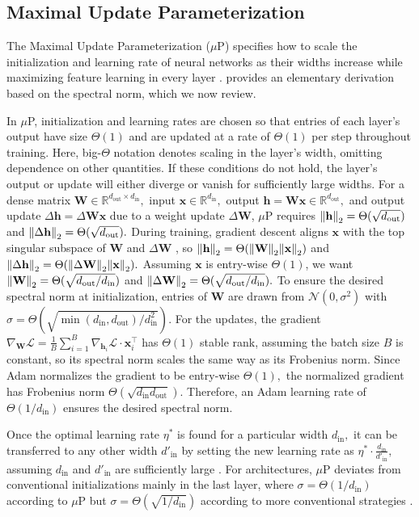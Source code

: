 \documentclass{article}
\newcommand{\mbf}[1]{{\boldsymbol{\mathbf{#1}}}}
\newcommand{\bm}{\mbf}
\theoremstyle{plain}
\theoremstyle{definition}
\theoremstyle{remark}
\newcommand{\mup}{$\mu$P\xspace}
\newcommand{\R}{\mathbb{R}}
\newcommand{\din}{{d_\mathrm{in}}}
\newcommand{\dout}{{d_\mathrm{out}}}
\begin{document}
%

\subsection{Maximal Update Parameterization}
The Maximal Update Parameterization (\mup) \citep{yang2021infty, yang2023iv, yang2021v} specifies how to scale the initialization and learning rate of neural networks as their widths increase while maximizing feature learning in every layer \citep{yang2021infty}. \citet{yang2023spectral} provides an elementary derivation based on the spectral norm, which we now review.

In \mup, initialization and learning rates are chosen so that entries of each layer's output have size $\Theta(1)$ and are updated at a rate of $\Theta(1)$ per step throughout training. Here, big-$\Theta$ notation denotes scaling in the layer's width, omitting dependence on other quantities. If these conditions do not hold, the layer's output or update will either diverge or vanish for sufficiently large widths.
For a dense matrix $\bm{W} \in \R^{\dout \times \din},$ input $\bm{x} \in \R^\din,$ output $\bm{h} = \bm{W} \bm{x} \in \R^\dout,$ and output update $\Delta \bm{h} = \Delta\bm{Wx}$ due to a weight update $\Delta\bm{W}$, \mup requires $\norm{\bm{h}}_2 = \Theta(\sqrt{\dout})$ and $\norm{\Delta\bm{h}}_2 = \Theta(\sqrt{\dout}).$ During training, gradient descent aligns $\bm{x}$ with the top singular subspace of $\bm{W}$ and $\Delta\bm{W}$ \citep{yang2023spectral,yang2023iv}, so $\norm{\bm{h}}_2 = \Theta(\norm{\bm{W}}_2 \norm{\bm{x}}_2)$ and $\norm{\Delta\bm{h}}_2 = \Theta(\norm{\Delta\bm{W}}_2 \norm{\bm{x}}_2).$ Assuming $\bm{x}$ is entry-wise  $\Theta(1)$, we want $\norm{\bm{W}}_2 = \Theta(\sqrt{\dout/\din})$ and $\norm{\Delta\bm{W}}_2 = \Theta(\sqrt{\dout/\din}).$ To ensure the desired spectral norm at initialization, entries of $\bm{W}$ are drawn from $\mathcal{N}(0, \sigma^2)$ with $\sigma = \Theta(\sqrt{\min(\din, \dout) / d^2_\mathrm{in}})$. For the updates, the gradient $\nabla_{\bm{W}} \mathcal{L} = \frac{1}{B}\sum_{i=1}^{B} \nabla_{\bm{h}_i}\mathcal{L} \cdot \bm{x}_i^\top$ has $\Theta(1)$ stable rank, assuming the batch size $B$ is constant, so its spectral norm scales the same way as its Frobenius norm. Since Adam normalizes the gradient to be entry-wise $\Theta(1),$ the normalized gradient has Frobenius norm $\Theta(\sqrt{\din \dout})$. Therefore, an Adam learning rate of $\Theta(1 / \din)$ ensures the desired spectral norm.

Once the optimal learning rate $\eta^*$ is found for a particular width $\din,$ it can be transferred to any other width $d'_\mathrm{in}$ by setting the new learning rate as $\eta^* \cdot \frac{\din}{d'_\mathrm{in}},$ assuming $\din$ and $d'_\mathrm{in}$ are sufficiently large \citep{yang2021v}. For architectures, \mup deviates from conventional initializations mainly in the last layer, where $\sigma = \Theta(1/\din)$ according to \mup but $\sigma = \Theta(\sqrt{1/\din})$ according to more conventional strategies \citep{lecun2002efficient, glorot2010understanding, he2015delving}.
\end{document}
